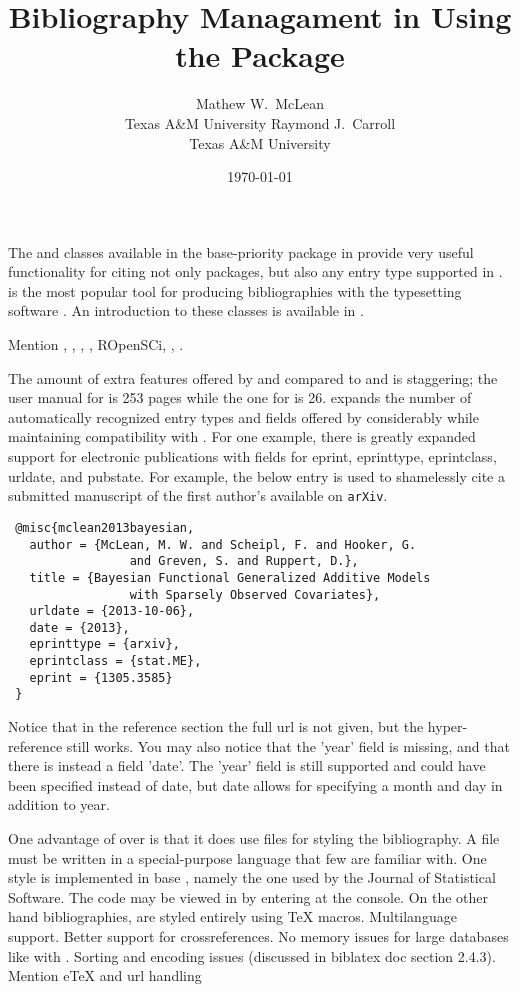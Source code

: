\documentclass[article]{jss}\usepackage[]{graphicx}\usepackage[]{color}
\title{\Biblatex{} Bibliography Managament in \R{} Using the \ourpkg{} Package}
\author{Mathew W.\ McLean\\ Texas A\&M University
\And
Raymond J.\ Carroll\\
Texas A\&M University
}
\date{\today}
\begin{document}
\maketitle

The  and  classes available in the base-priority  package in \R{} provide very useful functionality for citing not only \R{} packages, but also any entry type supported in \Bibtex.  \Bibtex{} \citep{bibtex} is the most popular tool for producing bibliographies with the typesetting software \proglang{\TeX}.  An introduction to these classes is available in \citet{hornik2012who}.

Mention , , , , ROpenSCi, , .

The amount of extra features offered by \Biblatex{} and \biber{} compared to \natbib{} and \Bibtex{} is staggering; the user manual for \Biblatex{} is 253 pages while the one for \natbib{} is 26.  \Biblatex{} expands the number of automatically recognized entry types and fields offered by \Bibtex{} considerably while maintaining compatibility with \Bibtex{}.  For one example, there is greatly expanded support for electronic publications with fields for eprint, eprinttype, eprintclass, urldate, and pubstate.  For example, the below entry is used to shamelessly cite a submitted manuscript of the first author's available on \texttt{arXiv}. 




 \begin{verbatim}
 @misc{mclean2013bayesian,
   author = {McLean, M. W. and Scheipl, F. and Hooker, G.
                 and Greven, S. and Ruppert, D.},
   title = {Bayesian Functional Generalized Additive Models 
                 with Sparsely Observed Covariates},
   urldate = {2013-10-06},
   date = {2013},
   eprinttype = {arxiv},
   eprintclass = {stat.ME},
   eprint = {1305.3585}
 }
 \end{verbatim}

Notice that in the reference section the full url is not given, but the hyper-reference still works.  You may also notice that the 'year' field is missing, and that there is instead a field 'date'.  The 'year' field is still supported and could have been specified instead of date, but date allows for specifying a month and day in addition to year.

One advantage of \Biblatex{} over \Bibtex{} is that it does use \bst{} files for styling the bibliography. A \bst{} file must be written in a special-purpose language that few are familiar with.  One style is implemented in base , namely the one used by the Journal of Statistical Software.  The code may be viewed in  by entering  at the console.  On the other hand \Biblatex{} bibliographies, are styled entirely using \TeX{} macros.  Multilanguage support.  Better support for crossreferences.  No memory issues for large databases like with \Bibtex{}.  Sorting and encoding issues (discussed in biblatex doc section 2.4.3). Mention eTeX and url handling
\end{document}

